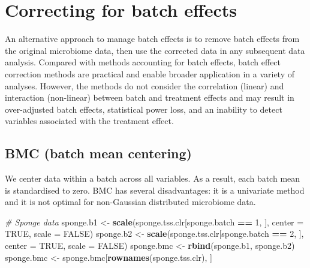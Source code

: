 \documentclass[]{book}
\newenvironment{Shaded}{\begin{snugshade}}{\end{snugshade}}
\newcommand{\KeywordTok}[1]{\textcolor[rgb]{0.13,0.29,0.53}{\textbf{#1}}}
\newcommand{\DataTypeTok}[1]{\textcolor[rgb]{0.13,0.29,0.53}{#1}}
\newcommand{\DecValTok}[1]{\textcolor[rgb]{0.00,0.00,0.81}{#1}}
\newcommand{\StringTok}[1]{\textcolor[rgb]{0.31,0.60,0.02}{#1}}
\newcommand{\CommentTok}[1]{\textcolor[rgb]{0.56,0.35,0.01}{\textit{#1}}}
\newcommand{\OtherTok}[1]{\textcolor[rgb]{0.56,0.35,0.01}{#1}}
\newcommand{\OperatorTok}[1]{\textcolor[rgb]{0.81,0.36,0.00}{\textbf{#1}}}
\newcommand{\NormalTok}[1]{#1}
\begin{document}
\section{Correcting for batch
effects}\label{correcting-for-batch-effects}

An alternative approach to manage batch effects is to remove batch
effects from the original microbiome data, then use the corrected data
in any subsequent data analysis. Compared with methods accounting for
batch effects, batch effect correction methods are practical and enable
broader application in a variety of analyses. However, the methods do
not consider the correlation (linear) and interaction (non-linear)
between batch and treatment effects and may result in over-adjusted
batch effects, statistical power loss, and an inability to detect
variables associated with the treatment effect.

\subsection{BMC (batch mean centering)}\label{bmc-batch-mean-centering}

We center data within a batch across all variables. As a result, each
batch mean is standardised to zero. BMC has several disadvantages: it is
a univariate method and it is not optimal for non-Gaussian distributed
microbiome data.

\begin{Shaded}
\begin{Highlighting}[]
\CommentTok{# Sponge data}
\NormalTok{sponge.b1 <-}\StringTok{ }\KeywordTok{scale}\NormalTok{(sponge.tss.clr[sponge.batch }\OperatorTok{==}\StringTok{ }\DecValTok{1}\NormalTok{, ], }\DataTypeTok{center =} \OtherTok{TRUE}\NormalTok{, }\DataTypeTok{scale =} \OtherTok{FALSE}\NormalTok{)}
\NormalTok{sponge.b2 <-}\StringTok{ }\KeywordTok{scale}\NormalTok{(sponge.tss.clr[sponge.batch }\OperatorTok{==}\StringTok{ }\DecValTok{2}\NormalTok{, ], }\DataTypeTok{center =} \OtherTok{TRUE}\NormalTok{, }\DataTypeTok{scale =} \OtherTok{FALSE}\NormalTok{)}
\NormalTok{sponge.bmc <-}\StringTok{ }\KeywordTok{rbind}\NormalTok{(sponge.b1, sponge.b2)}
\NormalTok{sponge.bmc <-}\StringTok{ }\NormalTok{sponge.bmc[}\KeywordTok{rownames}\NormalTok{(sponge.tss.clr), ]}
\end{Highlighting}
\end{Shaded}
\end{document}
